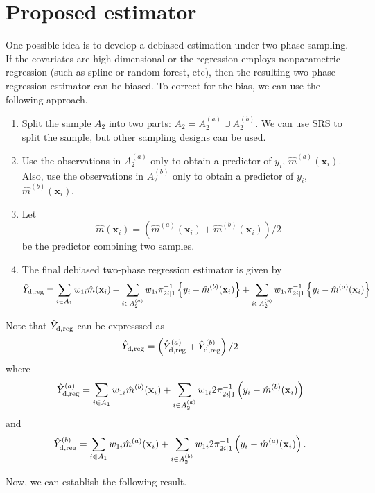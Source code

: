\documentclass[12pt]{article}
\newcommand{\bx}{\mathbf{x}}
\begin{document}
\section{Proposed estimator}


One possible idea is to develop a debiased estimation under two-phase sampling. If the covariates are high dimensional or the regression employs nonparametric regression (such as spline or random forest, etc), then the resulting two-phase regression estimator can be biased. To correct for the bias, we can use the following approach.

\begin{enumerate}
\item Split the sample $A_2$ into two parts: $A_2= A_2^{(a)} \cup A_2^{(b)}$.
We can use SRS to split the sample, but other sampling designs can be used. 
\item Use the observations in $A_2^{(a)}$ only to obtain a predictor of $y_i$, $\hat{m}^{(a)} (\bx_i)$. Also, use the observations in $A_2^{(b)}$ only to obtain a predictor of $y_i$, $\hat{m}^{(b)} (\bx_i)$. 
\item Let 
$$ \hat{m}(\bx_i) = \left( \hat{m}^{(a)} (\bx_i) + \hat{m}^{(b)} (\bx_i) \right)/ 2$$
be the predictor combining two samples. 
\item The final debiased two-phase regression estimator is given by 
\begin{equation}
\hat{Y}_{\rm d, reg} = \sum_{i \in A_1} w_{1i}  \hat{m}(\bx_i) +  \sum_{i \in A_2^{(a)} } w_{1i} \pi_{2i \mid 1}^{-1}   \left\{y_i - \hat{m}^{(b)} (\bx_i) \right\} +\sum_{i \in A_2^{(b)} } w_{1i} \pi_{2i \mid 1}^{-1}   \left\{y_i - \hat{m}^{(a)} (\bx_i) \right\}
\label{debiased}
\end{equation}
\end{enumerate}


Note that $\hat{Y}_{\rm d, reg}$ can be expresssed as 
$$ \hat{Y}_{\rm d, reg}= \left( \hat{Y}_{\rm d, reg}^{(a)} + \hat{Y}_{\rm d, reg}^{(b)} \right)/ 2 $$
where 
$$\hat{Y}_{\rm d, reg}^{(a)} =\sum_{i \in A_1} w_{1i} \hat{m}^{(b)}(\bx_i ) + \sum_{i \in A_2^{(a)}} w_{1i} 2\pi_{2i \mid 1}^{-1} \left( y_i - \hat{m}^{(b)}(\bx_i) \right)$$
and $$\hat{Y}_{\rm d, reg}^{(b)} =\sum_{i \in A_1} w_{1i} \hat{m}^{(a)}(\bx_i ) + \sum_{i \in A_2^{(b)}} w_{1i} 2\pi_{2i \mid 1}^{-1} \left( y_i - \hat{m}^{(a)}(\bx_i) \right).$$

Now, we can establish the following result. 
\end{document}
